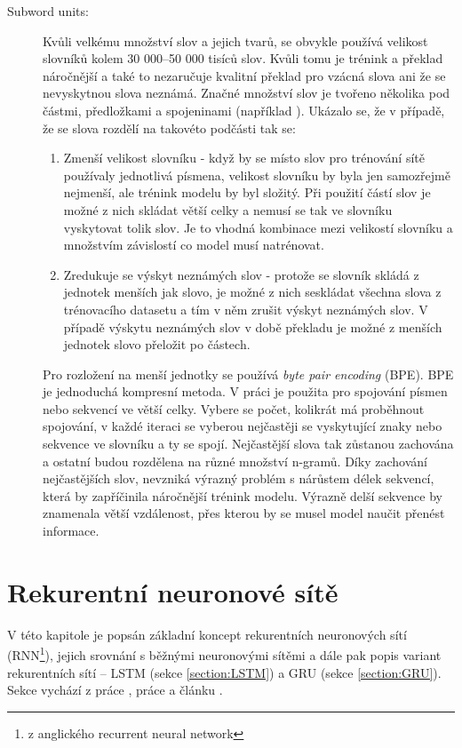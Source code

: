\begin{description}
  \item[Subword units:]\label{subsection:subwords} Kvůli velkému množství slov a jejich tvarů, se obvykle používá velikost slovníků kolem 30 000--50 000 tisíců slov. Kvůli tomu je trénink a překlad náročnější a také to nezaručuje kvalitní překlad pro vzácná slova ani že se nevyskytnou slova neznámá. Značné množství slov je tvořeno několika pod částmi, předložkami a spojeninami (například ). Ukázalo se, že v případě, že se slova rozdělí na takovéto podčásti tak se:

      \begin{enumerate}
        \item Zmenší velikost slovníku - když by se místo slov pro trénování sítě používaly jednotlivá písmena, velikost slovníku by byla jen samozřejmě nejmenší, ale trénink modelu by byl složitý. Při použití částí slov je možné z nich skládat větší celky a nemusí se tak ve slovníku vyskytovat tolik slov. Je to vhodná kombinace mezi velikostí slovníku a množstvím závislostí co model musí natrénovat.
        \item Zredukuje se výskyt neznámých slov - protože se slovník skládá z jednotek menších jak slovo, je možné z nich seskládat všechna slova z trénovacího datasetu a tím v něm zrušit výskyt neznámých slov. V případě výskytu neznámých slov v době překladu je možné z menších jednotek slovo přeložit po částech.
      \end{enumerate}

      Pro rozložení na menší jednotky se používá \emph{byte pair encoding} (BPE). BPE je jednoduchá kompresní metoda. V práci \cite{subwords} je použita pro spojování písmen nebo sekvencí ve větší celky. Vybere se počet, kolikrát má proběhnout spojování, v každé iteraci se vyberou nejčastěji se vyskytující znaky nebo sekvence ve slovníku a ty se spojí. Nejčastější slova tak zůstanou zachována a ostatní budou rozdělena na různé množství n-gramů. Díky zachování nejčastějších slov, nevzniká výrazný problém s nárůstem délek sekvencí, která by zapříčinila náročnější trénink modelu. Výrazně delší sekvence by znamenala větší vzdálenost, přes kterou by se musel model naučit přenést informace.
\end{description}

\section{Rekurentní neuronové sítě}\label{section:rnn}
V této kapitole je popsán základní koncept rekurentních neuronových sítí (RNN\footnote{z anglického recurrent neural network}), jejich srovnání s běžnými neuronovými sítěmi a dále pak popis variant rekurentních sítí -- LSTM (sekce \ref{section:LSTM}) a GRU (sekce \ref{section:GRU}). Sekce vychází z práce \cite{nmtThesis}, práce \cite{nmtTutorial} a článku \cite{understandingLSTM}.


